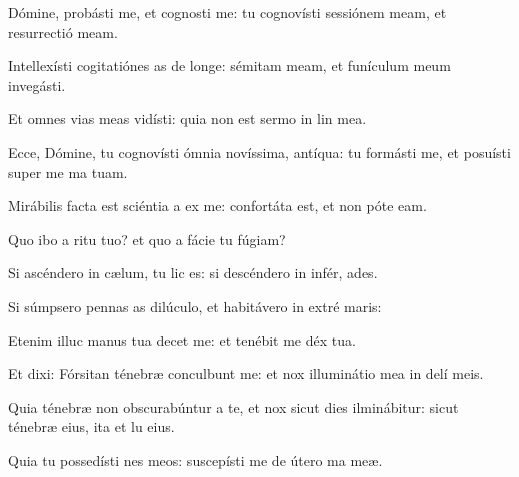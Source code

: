\item Dómine, probásti me, et cognosti me:\psstar{} tu cognovísti sessiónem meam, et resurrectió meam.

\item Intellexísti cogitatiónes as de longe:\psstar{} sémitam meam, et funículum meum invegásti.

\item Et omnes vias meas vidísti:\psstar{} quia non est sermo in lin mea.

\item Ecce, Dómine, tu cognovísti ómnia novíssima,  antíqua:\psstar{} tu formásti me, et posuísti super me ma tuam.

\item Mirábilis facta est sciéntia a ex me:\psstar{} confortáta est, et non póte  eam.

\item Quo ibo a ritu tuo?\psstar{} et quo a fácie tu fúgiam?

\item Si ascéndero in cælum, tu lic es:\psstar{} si descéndero in infér, ades.

\item Si súmpsero pennas as dilúculo,\psstar{} et habitávero in extré maris:

\item Etenim illuc manus tua decet me:\psstar{} et tenébit me déx tua.

\item Et dixi: Fórsitan ténebræ conculbunt me:\psstar{} et nox illuminátio mea in delí meis.

\item Quia ténebræ non obscurabúntur a te, et nox sicut dies ilminábitur:\psstar{} sicut ténebræ eius, ita et lu eius.

\item Quia tu possedísti nes meos:\psstar{} suscepísti me de útero ma meæ.
